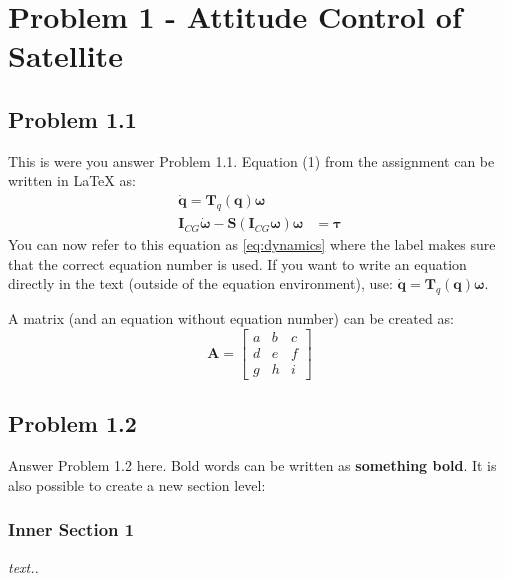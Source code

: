 \section*{Problem 1 - Attitude Control of Satellite}


\subsection*{Problem 1.1} 
This is were you answer Problem 1.1. Equation (1) from the assignment can be written in \LaTeX{} as:
\begin{equation}
\label{eq:dynamics}
	\begin{aligned}
		\dot{\mathbf{q}} = \mathbf{T}_q (\mathbf{q} ) \boldsymbol{\omega} \\
		\mathbf{I}_{CG} \dot{\boldsymbol{\omega}} - \mathbf{S} (\mathbf{I}_{CG} \boldsymbol{\omega} ) \boldsymbol{\omega} & =  \boldsymbol{\tau}
	\end{aligned}	
\end{equation}
You can now refer to this equation as \eqref{eq:dynamics} where the label makes sure that the correct equation number is used. If you want to write an equation directly in the text (outside of the equation environment), use: $\dot{\mathbf{q}} = \mathbf{T}_q (\mathbf{q} ) \boldsymbol{\omega}$. %

A matrix (and an equation without equation number) can be created as: 
\begin{equation*}	%
	\mathbf{A} = 
	\begin{bmatrix}
		a & b & c \\ d & e & f \\ g & h & i
	\end{bmatrix}
\end{equation*}

\subsection*{Problem 1.2}
Answer Problem 1.2 here. Bold words can be written as \textbf{something bold}. It is also possible to create a new section level:
\subsubsection*{Inner Section 1}
\emph{text..}

